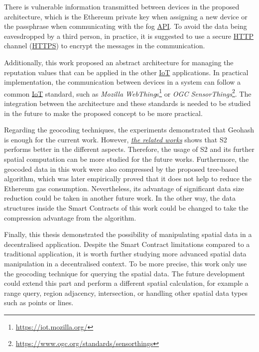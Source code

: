 \npara There is vulnerable information transmitted between devices in the proposed architecture, which is the Ethereum private key when assigning a new device or the passphrase when communicating with the fog \hyperref[Acronym-API]{API}.
To avoid the data being eavesdropped by a third person, in practice, it is suggested to use a secure \hyperref[Acronym-HTTP]{HTTP} channel (\hyperref[Acronym-HTTPS]{HTTPS}) to encrypt the messages in the communication.

\npara Additionally, this work proposed an abstract architecture for managing the reputation values that can be applied in the other \hyperref[Acronym-IoT]{IoT} applications.
In practical implementation, the communication between devices in a system can follow a common \hyperref[Acronym-IoT]{IoT} standard, such as \textit{Mozilla WebThing}s\footnote{\url{https://iot.mozilla.org/}} or \textit{OGC SensorThings}\footnote{\url{https://www.ogc.org/standards/sensorthings}}.
The integration between the architecture and these standards is needed to be studied in the future to make the proposed concept to be more practical.

\npara Regarding the geocoding techniques, the experiments demonstrated that Geohash is enough for the current work.
However, \hyperref[RelatedWorks]{\textit{the related works}} shows that S2 performs better in the different aspects.
Therefore, the usage of S2 and its further spatial computation can be more studied for the future works.
Furthermore, the geocoded data in this work were also compressed by the proposed tree-based algorithm, which was later empirically proved that it does not help to reduce the Ethereum gas consumption.
Nevertheless, its advantage of significant data size reduction could be taken in another future work.
In the other way, the data structures inside the Smart Contracts of this work could be changed to take the compression advantage from the algorithm.

\npara Finally, this thesis demonstrated the possibility of manipulating spatial data in a decentralised application.
Despite the Smart Contract limitations compared to a traditional application, it is worth further studying more advanced spatial data manipulation in a decentralised context.
To be more precise, this work only use the geocoding technique for querying the spatial data.
The future development could extend this part and perform a different spatial calculation, for example a range query, region adjacency, intersection, or handling other spatial data types such as points or lines.
